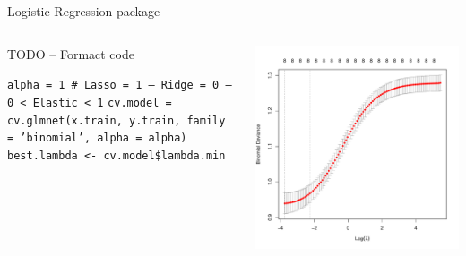 
\begin{frame}{Logistic Regression package}

\begin{columns}[T]
\begin{column}{0.5\textwidth}
TODO -- Formact code

\texttt{alpha = 1   # Lasso = 1 -- Ridge = 0 -- 0 < Elastic < 1}
\texttt{cv.model = cv.glmnet(x.train, y.train, family = 'binomial', alpha = alpha)}
\texttt{best.lambda <- cv.model\$lambda.min}
\end{column}
\begin{column}{0.5\textwidth}
\includegraphics[width=0.85\columnwidth]{plots/cv_lambda.pdf}
\end{column}
\end{columns}

\end{frame}

